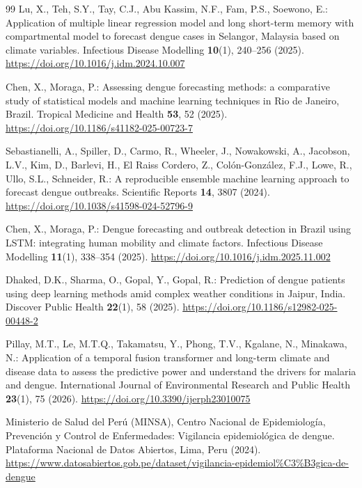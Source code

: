 \documentclass[runningheads]{llncs}
\begin{document}
\begin{thebibliography}{99}
Lu, X., Teh, S.Y., Tay, C.J., Abu Kassim, N.F., Fam, P.S., Soewono, E.:
Application of multiple linear regression model and long short-term memory with
compartmental model to forecast dengue cases in Selangor, Malaysia based on climate
variables. Infectious Disease Modelling \textbf{10}(1), 240--256 (2025).
\url{https://doi.org/10.1016/j.idm.2024.10.007}

Chen, X., Moraga, P.:
Assessing dengue forecasting methods: a comparative study of statistical models and
machine learning techniques in Rio de Janeiro, Brazil. Tropical Medicine and Health
\textbf{53}, 52 (2025). \url{https://doi.org/10.1186/s41182-025-00723-7}

Sebastianelli, A., Spiller, D., Carmo, R., Wheeler, J., Nowakowski, A., Jacobson, L.V.,
Kim, D., Barlevi, H., El Raiss Cordero, Z., Col\'on-Gonz\'alez, F.J., Lowe, R., Ullo, S.L.,
Schneider, R.: A reproducible ensemble machine learning approach to forecast dengue
outbreaks. Scientific Reports \textbf{14}, 3807 (2024).
\url{https://doi.org/10.1038/s41598-024-52796-9}

Chen, X., Moraga, P.:
Dengue forecasting and outbreak detection in Brazil using LSTM: integrating human mobility
and climate factors. Infectious Disease Modelling \textbf{11}(1), 338--354 (2025).
\url{https://doi.org/10.1016/j.idm.2025.11.002}

Dhaked, D.K., Sharma, O., Gopal, Y., Gopal, R.:
Prediction of dengue patients using deep learning methods amid complex weather conditions
in Jaipur, India. Discover Public Health \textbf{22}(1), 58 (2025).
\url{https://doi.org/10.1186/s12982-025-00448-2}

Pillay, M.T., Le, M.T.Q., Takamatsu, Y., Phong, T.V., Kgalane, N., Minakawa, N.:
Application of a temporal fusion transformer and long-term climate and disease data to
assess the predictive power and understand the drivers for malaria and dengue.
International Journal of Environmental Research and Public Health \textbf{23}(1), 75 (2026).
\url{https://doi.org/10.3390/ijerph23010075}

Ministerio de Salud del Per\'u (MINSA), Centro Nacional de Epidemiolog\'ia, Prevenci\'on y
Control de Enfermedades: Vigilancia epidemiol\'ogica de dengue. Plataforma Nacional de
Datos Abiertos, Lima, Peru (2024).
\url{https://www.datosabiertos.gob.pe/dataset/vigilancia-epidemiol\%C3\%B3gica-de-dengue}


\end{thebibliography}
\end{document}
